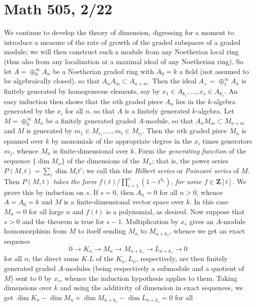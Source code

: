 \documentclass[10pt]{article}
\begin{document}
\section*{Math 505, 2/22}

We continue to develop the theory of dimension, digressing for a moment
to introduce a measure of the rate of growth of the graded subspaces of
a graded module; we will then construct such a module from any
Noetherian local ring (thus also from any localization at a maximal
ideal of any Noetherian ring). So let $A=\oplus_0^\infty A_n$ be a
Noetherian graded ring with $A_0 = k$ a field (not assumed to be
algebraically closed), so that $A_n A_m\subset A_{n+m}$. Then the ideal
$A_+ = \oplus_1^\infty A_n$ is finitely generated by homogeneous
elements, say by $x_1\in A_{k_1},\ldots,x_s\in A_{k_s}$. An easy
induction then shows that the $n$th graded piece $A_n$ lies in the
$k$-algebra generated by the $x_i$ for all $n$, so that $A$ is a
finitely generated $k$-algebra. Let $M = \oplus_0^\infty M_n$ be a
finitely generated graded $A$-module, so that $A_n M_m\subset M_{n+m}$
and $M$ is generated by $m_1\in M_{r_1},\ldots,m_t\in M_{r_t}$. Then the
$n$th graded piece $M_n$ is spanned over $k$ by monomials of the
appropriate degree in the $x_i$ times generators $m_j$, whence $M_n$ is
finite-dimensional over $k$. Form the {\sl generating function} of the
sequence $\{\dim M_n\}$ of the dimensions of the $M_n$; that is, the
power series $P(M,t) = \sum_i \dim M_i t^i$; we call this the {\sl
  Hilbert series} or {\sl Poincar\'e series} of $M$. Then {\sl $P(M,t)$
  takes the form $f(t)/\prod_{i=1}^s (1-t^{k_i})$, for some $f\in\mathbf
  Z[t]$}. We prove this by induction on $s$. If $s=0$, then $A_n = 0$
for all $n>0$, whence $A= A_0 = k$ and $M$ is a finite-dimensional
vector space over $k$. In this case $M_n = 0$ for all large $n$ and
$f(t)$ is a polynomial, as desired. Now suppose that $s>0$ and the
theorem is true for $s-1$. Multiplication by $x_s$ gives an $A$-module
homomorphism from $M$ to itself sending $M_n$ to $M_{n+k_s}$, whence we
get an exact sequence
$$0\rightarrow K_n\rightarrow M_n\rightarrow M_{n+k_s}\rightarrow
L_{n+k_s}\rightarrow 0$$
\noindent for all $n$; the direct sums $K.L$ of the $K_n,L_n$,
respectively, are then finitely generated graded $A$-modules (being
respectively a submodule and a quotient of $M$) sent to 0 by $x_s$,
whence the induction hypothesis applies to them. Taking dimensions over
$k$ and using the additivity of dimension in exact sequences, we get
$\dim K_n - \dim M_n + \dim M_{n+k_s} - \dim L_{n+k_s} = 0$ for all
\end{document}
